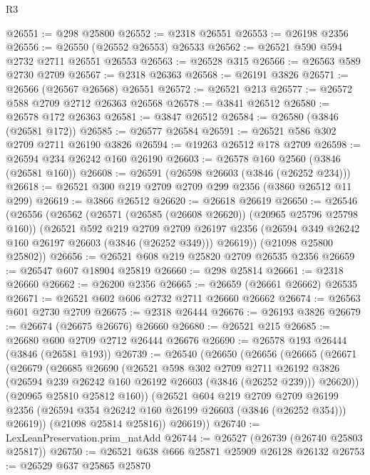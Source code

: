 \begin{lexlean}{R3}
\begin{coremodule}
@26551 := @298 @25800
@26552 := @2318 @26551
@26553 := @26198 @2356
@26556 := @26550 (@26552 @26553) @26533
@26562 := @26521 @590 @594 @2732 @2711 @26551 @26553
@26563 := @26528 @315
@26566 := @26563 @589 @2730 @2709
@26567 := @2318 @26363
@26568 := @26191 @3826
@26571 := @26566 (@26567 @26568) @26551
@26572 := @26521 @213
@26577 := @26572 @588 @2709 @2712 @26363 @26568
@26578 := @3841 @26512
@26580 := @26578 @172 @26363
@26581 := @3847 @26512
@26584 := @26580 (@3846 (@26581 @172))
@26585 := @26577 @26584
@26591 := @26521 @586 @302 @2709 @2711 @26190 @3826
@26594 := @19263 @26512 @178 @2709
@26598 := @26594 @234 @26242 @160 @26190
@26603 := @26578 @160 @2560 (@3846 (@26581 @160))
@26608 := @26591 (@26598 @26603 (@3846 (@26252 @234)))
@26618 := @26521 @300 @219 @2709 @2709 @299 @2356 (@3860 @26512 @11 @299)
@26619 := @3866 @26512
@26620 := @26618 @26619
@26650 := @26546
    (@26556
      (@26562
        (@26571 (@26585 (@26608 @26620)) (@20965 @25796 @25798 @160))
        (@26521
          @592
          @219
          @2709
          @2709
          @26197
          @2356
          (@26594 @349 @26242 @160 @26197 @26603 (@3846 (@26252 @349)))
          @26619))
      (@21098 @25800 @25802))
@26656 := @26521 @608 @219 @25820 @2709 @26535 @2356
@26659 := @26547 @607 @18904 @25819
@26660 := @298 @25814
@26661 := @2318 @26660
@26662 := @26200 @2356
@26665 := @26659 (@26661 @26662) @26535
@26671 := @26521 @602 @606 @2732 @2711 @26660 @26662
@26674 := @26563 @601 @2730 @2709
@26675 := @2318 @26444
@26676 := @26193 @3826
@26679 := @26674 (@26675 @26676) @26660
@26680 := @26521 @215
@26685 := @26680 @600 @2709 @2712 @26444 @26676
@26690 := @26578 @193 @26444 (@3846 (@26581 @193))
@26739 := @26540
    (@26650
      (@26656
        (@26665
          (@26671
            (@26679
              (@26685
                @26690
                (@26521
                  @598
                  @302
                  @2709
                  @2711
                  @26192
                  @3826
                  (@26594 @239 @26242 @160 @26192 @26603 (@3846 (@26252 @239)))
                  @26620))
              (@20965 @25810 @25812 @160))
            (@26521
              @604
              @219
              @2709
              @2709
              @26199
              @2356
              (@26594 @354 @26242 @160 @26199 @26603 (@3846 (@26252 @354)))
              @26619))
          (@21098 @25814 @25816))
        @26619))
@26740 := LexLeanPreservation.prim_natAdd
@26744 := @26527 (@26739 (@26740 @25803 @25817))
@26750 := @26521 @638 @666 @25871 @25909 @26128 @26132
@26753 := @26529 @637 @25865 @25870

\end{coremodule}
\end{lexlean}
